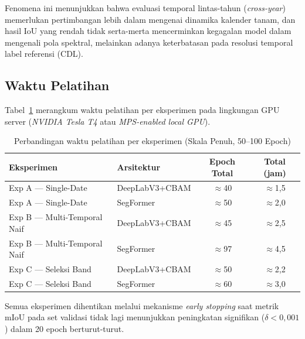 Fenomena ini menunjukkan bahwa evaluasi temporal lintas-tahun (\textit{cross-year}) 
memerlukan pertimbangan lebih dalam mengenai dinamika kalender tanam, dan hasil IoU 
yang rendah tidak serta-merta mencerminkan kegagalan model dalam mengenali pola 
spektral, melainkan adanya keterbatasan pada resolusi temporal label referensi (CDL).

\subsection{Waktu Pelatihan}

Tabel~\ref{tab:waktu_pelatihan} merangkum waktu pelatihan per eksperimen pada lingkungan GPU server (\textit{NVIDIA Tesla T4} atau \textit{MPS-enabled local GPU}).

\begin{table}[H]
    \centering
    \caption{Perbandingan waktu pelatihan per eksperimen (Skala Penuh, 50--100 Epoch)}
    \label{tab:waktu_pelatihan}
    \begin{tabular}{|l|l|c|c|}
    \hline
    \textbf{Eksperimen} & \textbf{Arsitektur} & \textbf{Epoch Total} & \textbf{Total (jam)} \\
    \hline
    Exp A --- Single-Date & DeepLabV3+CBAM & $\approx$40 & $\approx$1,5 \\
    Exp A --- Single-Date & SegFormer      & $\approx$50 & $\approx$2,0 \\
    Exp B --- Multi-Temporal Naif & DeepLabV3+CBAM & $\approx$45 & $\approx$2,5 \\
    Exp B --- Multi-Temporal Naif & SegFormer      & $\approx$97 & $\approx$4,5 \\
    Exp C --- Seleksi Band & DeepLabV3+CBAM & $\approx$50 & $\approx$2,2 \\
    Exp C --- Seleksi Band & SegFormer      & $\approx$60 & $\approx$3,0 \\
    \hline
    \end{tabular}
\end{table}

Semua eksperimen dihentikan melalui mekanisme \textit{early stopping} saat metrik mIoU pada 
set validasi tidak lagi menunjukkan peningkatan signifikan ($\delta < 0,001$) dalam 20 epoch berturut-turut.
